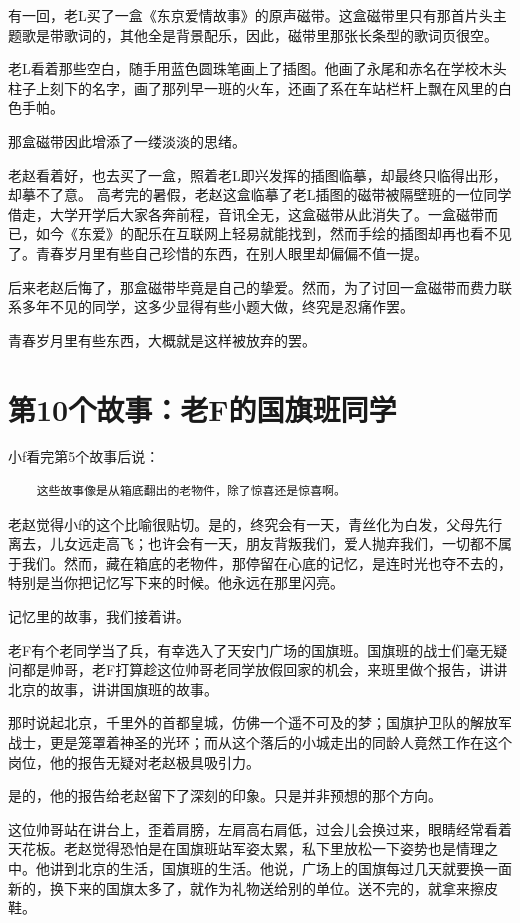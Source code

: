 \documentclass[openany]{ctexbook}
\begin{document}
有一回，老L买了一盒《东京爱情故事》的原声磁带。这盒磁带里只有那首片头主题歌是带歌词的，其他全是背景配乐，因此，磁带里那张长条型的歌词页很空。

老L看着那些空白，随手用蓝色圆珠笔画上了插图。他画了永尾和赤名在学校木头柱子上刻下的名字，画了那列早一班的火车，还画了系在车站栏杆上飘在风里的白色手帕。

那盒磁带因此增添了一缕淡淡的思绪。

老赵看着好，也去买了一盒，照着老L即兴发挥的插图临摹，却最终只临得出形，却摹不了意。
高考完的暑假，老赵这盒临摹了老L插图的磁带被隔壁班的一位同学借走，大学开学后大家各奔前程，音讯全无，这盒磁带从此消失了。一盒磁带而已，如今《东爱》的配乐在互联网上轻易就能找到，然而手绘的插图却再也看不见了。青春岁月里有些自己珍惜的东西，在别人眼里却偏偏不值一提。

后来老赵后悔了，那盒磁带毕竟是自己的挚爱。然而，为了讨回一盒磁带而费力联系多年不见的同学，这多少显得有些小题大做，终究是忍痛作罢。

青春岁月里有些东西，大概就是这样被放弃的罢。

\chapter*{第10个故事：老F的国旗班同学}\label{f10}

小f看完第5个故事后说：

\begin{verbatim}
    这些故事像是从箱底翻出的老物件，除了惊喜还是惊喜啊。
\end{verbatim}

老赵觉得小f的这个比喻很贴切。是的，终究会有一天，青丝化为白发，父母先行离去，儿女远走高飞；也许会有一天，朋友背叛我们，爱人抛弃我们，一切都不属于我们。然而，藏在箱底的老物件，那停留在心底的记忆，是连时光也夺不去的，特别是当你把记忆写下来的时候。他永远在那里闪亮。

记忆里的故事，我们接着讲。

老F有个老同学当了兵，有幸选入了天安门广场的国旗班。国旗班的战士们毫无疑问都是帅哥，老F打算趁这位帅哥老同学放假回家的机会，来班里做个报告，讲讲北京的故事，讲讲国旗班的故事。

那时说起北京，千里外的首都皇城，仿佛一个遥不可及的梦；国旗护卫队的解放军战士，更是笼罩着神圣的光环；而从这个落后的小城走出的同龄人竟然工作在这个岗位，他的报告无疑对老赵极具吸引力。

是的，他的报告给老赵留下了深刻的印象。只是并非预想的那个方向。

这位帅哥站在讲台上，歪着肩膀，左肩高右肩低，过会儿会换过来，眼睛经常看着天花板。老赵觉得恐怕是在国旗班站军姿太累，私下里放松一下姿势也是情理之中。他讲到北京的生活，国旗班的生活。他说，广场上的国旗每过几天就要换一面新的，换下来的国旗太多了，就作为礼物送给别的单位。送不完的，就拿来擦皮鞋。
\end{document}
